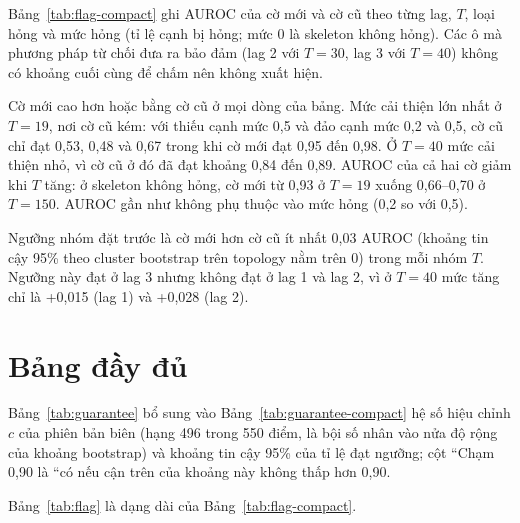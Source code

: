 \documentclass[11pt,a4paper]{article}
\begin{document}
Bảng~\ref{tab:flag-compact} ghi AUROC của cờ mới và cờ cũ theo từng lag, $T$, loại hỏng và mức hỏng (tỉ lệ cạnh bị hỏng; mức 0 là skeleton không hỏng). Các ô mà phương pháp từ chối đưa ra bảo đảm (lag 2 với $T=30$, lag 3 với $T=40$) không có khoảng cuối cùng để chấm nên không xuất hiện.



Cờ mới cao hơn hoặc bằng cờ cũ ở mọi dòng của bảng. Mức cải thiện lớn nhất ở $T=19$, nơi cờ cũ kém: với thiếu cạnh mức 0,5 và đảo cạnh mức 0,2 và 0,5, cờ cũ chỉ đạt 0,53, 0,48 và 0,67 trong khi cờ mới đạt 0,95 đến 0,98. Ở $T=40$ mức cải thiện nhỏ, vì cờ cũ ở đó đã đạt khoảng 0,84 đến 0,89. AUROC của cả hai cờ giảm khi $T$ tăng: ở skeleton không hỏng, cờ mới từ 0,93 ở $T=19$ xuống 0,66--0,70 ở $T=150$. AUROC gần như không phụ thuộc vào mức hỏng (0,2 so với 0,5).

Ngưỡng nhóm đặt trước là cờ mới hơn cờ cũ ít nhất 0,03 AUROC (khoảng tin cậy 95\% theo cluster bootstrap trên topology nằm trên 0) trong mỗi nhóm $T$. Ngưỡng này đạt ở lag 3 nhưng không đạt ở lag 1 và lag 2, vì ở $T=40$ mức tăng chỉ là +0,015 (lag 1) và +0,028 (lag 2).

\appendix
\section{Bảng đầy đủ}

Bảng~\ref{tab:guarantee} bổ sung vào Bảng~\ref{tab:guarantee-compact} hệ số hiệu chỉnh $c$ của phiên bản biên (hạng 496 trong 550 điểm, là bội số nhân vào nửa độ rộng của khoảng bootstrap) và khoảng tin cậy 95\% của tỉ lệ đạt ngưỡng; cột ``Chạm 0,90 là ``có nếu cận trên của khoảng này không thấp hơn 0,90.



Bảng~\ref{tab:flag} là dạng dài của Bảng~\ref{tab:flag-compact}.


\end{document}
